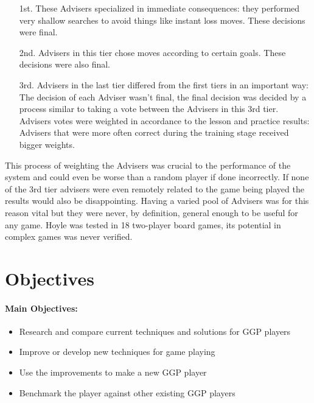 \begin{enumerate}

\item [1st.] These Advisers specialized in immediate consequences: they performed very shallow searches to avoid things like instant loss moves. These decisions were final.

\item [2nd.] Advisers in this tier chose moves according to certain goals. These decisions were also final.

\item [3rd.] Advisers in the last tier differed from the first tiers in an important way: The decision of each Adviser wasn’t final, the final decision was decided by a process similar to taking a vote between the Advisers in this 3rd tier. Advisers votes were weighted in accordance to the lesson and practice results: Advisers that were more often correct during the training stage received bigger weights.

\end{enumerate}
This process of weighting the Advisers was crucial to the performance of the system and could even be worse than a random player if done incorrectly. If none of the 3rd tier advisers were even remotely related to the game being played the results would also be disappointing. Having a varied pool of Advisers was for this reason vital but they were never, by definition, general enough to be useful for any game. Hoyle was tested in 18 two-player board games, its potential in complex games was never verified.


\section{Objectives}

\paragraph{Main Objectives:}
\begin{itemize}
\item Research and compare current techniques and solutions for GGP players
\item Improve or develop new techniques for game playing
\item Use the improvements to make a new GGP player
\item Benchmark the player against other existing GGP players
\end{itemize}

